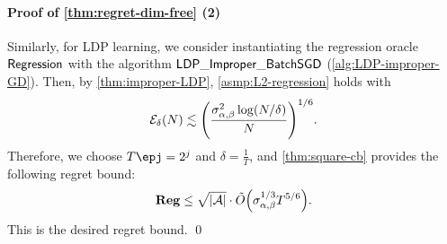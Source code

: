 \paragraph{Proof of \cref{thm:regret-dim-free} (2)}
Similarly, for LDP learning, we consider instantiating the regression oracle $\mathsf{Regression}$ with the algorithm $\mathsf{LDP\_Improper\_BatchSGD}$ (\cref{alg:LDP-improper-GD}). Then, by \cref{thm:improper-LDP}, \cref{asmp:L2-regression} holds with 
\begin{align*}
    \mathcal{E}_\delta(N)\lesssim {\left( \frac{\sigma_{\alpha,\beta}^2\log(N/\delta)}{N} \right)}^{1/6}.
\end{align*}
Therefore, we choose $T\epj=2^j$ and $\delta=\frac{1}{T}$, and \cref{thm:square-cb} provides the following regret bound:
\begin{align*}
    \mathbf{Reg}\leq \sqrt{|\mathcal{A}|}\cdot \tilde{O}{\left( \sigma_{\alpha,\beta}^{1/3}T^{5/6} \right)}.
\end{align*}
This is the desired regret bound.
\qed
